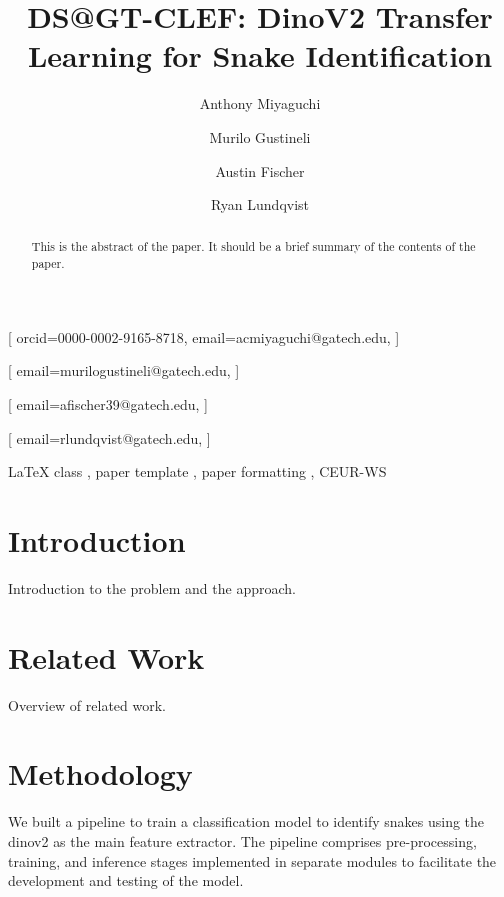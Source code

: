 \documentclass[]{style/ceurart}
\begin{document}


\title{DS@GT-CLEF: DinoV2 Transfer Learning for Snake Identification}

\author[1]{Anthony Miyaguchi}[
orcid=0000-0002-9165-8718,
email=acmiyaguchi@gatech.edu,
]
\cormark[1]
\author[1]{Murilo Gustineli}[
email=murilogustineli@gatech.edu,
]
\cormark[1]
\author[1]{Austin Fischer}[
email=afischer39@gatech.edu,
]
\author[1]{Ryan Lundqvist}[
email=rlundqvist@gatech.edu,
]

\address[1]{Georgia Institute of Technology, North Ave NW, Atlanta, GA 30332}


\begin{abstract}
    This is the abstract of the paper. 
    It should be a brief summary of the contents of the paper.
\end{abstract}

\begin{keywords}
  LaTeX class \sep
  paper template \sep
  paper formatting \sep
  CEUR-WS
\end{keywords}


\maketitle

\section{Introduction}

Introduction to the problem and the approach.

\section{Related Work}

Overview of related work.

\section{Methodology}

We built a pipeline to train a classification model to identify snakes using the dinov2 \cite{oquab2023dinov2} as the main feature extractor.
The pipeline comprises pre-processing, training, and inference stages implemented in separate modules to facilitate the development and testing of the model.
\end{document}
